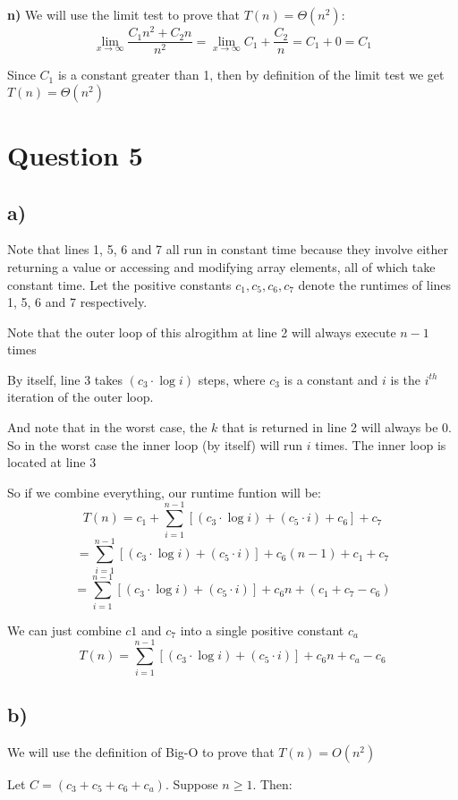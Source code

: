 \documentclass{article}
\begin{document}
\textbf{n)} We will use the limit test to prove that $T(n) = \Theta(n^2)$:
\[\lim_{x \to \infty} \frac{C_1n^2 + C_2n}{n^2} = \lim_{x \to \infty} C_1 + \frac{C_2}{n} = C_1 + 0 = C_1\]

Since $C_1$ is a constant greater than 1, then by definition of the limit test we get $T(n) = \Theta(n^2)$

\section*{Question 5}

\subsection*{a)} 
Note that lines 1, 5, 6 and 7 all run in constant time because they involve either returning a value or accessing and modifying array elements, all of which take constant time.
Let the positive constants $c_1, c_5, c_6, c_7$ denote the runtimes of lines 1, 5, 6 and 7 respectively.

Note that the outer loop of this alrogithm at line 2 will always execute $n-1$ times

By itself, line 3 takes $(c_3 \cdot \log i)$ steps, where $c_3$ is a constant and $i$ is the $i^{th}$ iteration of the outer loop.

And note that in the worst case, the $k$ that is returned in line 2 will always be $0$. So in the worst case the inner loop (by itself) will run $i$ times. The inner loop is located at line 3

So if we combine everything, our runtime funtion will be:
\[ T(n) = c_1 + \sum_{i=1}^{n-1} [(c_3 \cdot \log i) + (c_5 \cdot i) + c_6] + c_7 \]
\[ = \sum_{i=1}^{n-1} [(c_3 \cdot \log i) + (c_5 \cdot i)]  + c_6(n-1) + c_1 + c_7 \]
\[ = \sum_{i=1}^{n-1} [(c_3 \cdot \log i) + (c_5 \cdot i)] + c_6n + (c_1 + c_7 - c_6) \]

We can just combine $c1$ and $c_7$ into a single positive constant $c_a$
\[T(n) = \sum_{i=1}^{n-1} [(c_3 \cdot \log i) + (c_5 \cdot i)] + c_6n + c_a - c_6 \]

\subsection*{b)}
We will use the definition of Big-O to prove that $T(n) = O(n^2)$

Let $C = (c_3+c_5+c_6+c_a)$. Suppose $n \ge 1$. Then:
\end{document}
